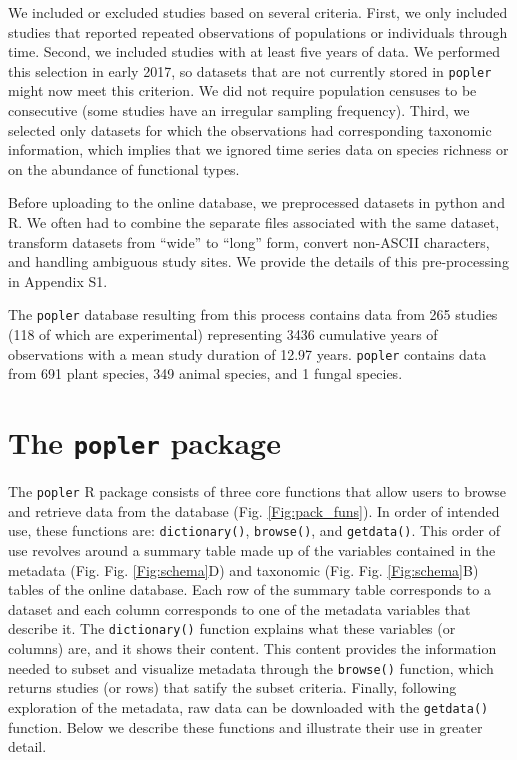 \documentclass{article}\usepackage[]{graphicx}\usepackage[]{color}
\begin{document}
We included or excluded studies based on several criteria. First, we only included studies that reported repeated observations of populations or individuals through time. Second, we included studies with at least five years of data. We performed this selection in early 2017, so datasets that are not currently stored in \texttt{popler} might now meet this criterion. We did not require population censuses to be consecutive (some studies have an irregular sampling frequency). Third, we selected only datasets for which the observations had corresponding taxonomic information, which implies that we ignored time series data on species richness or on the abundance of functional types.

Before uploading to the online database, we preprocessed datasets in python and R. We often had to combine the separate files associated with the same dataset, transform datasets from ``wide'' to ``long'' form, convert non-ASCII characters, and handling ambiguous study sites. We provide the details of this pre-processing in Appendix S1.


The \texttt{popler} database resulting from this process contains data from 265 studies (118 of which are experimental) representing 3436 cumulative years of observations with a mean study duration of 12.97 years. \texttt{popler} contains data from 691 plant species, 349 animal species, and 1 fungal species.

\section*{The \texttt{popler} package}
The \texttt{popler} R package consists of three core functions that allow users to browse and retrieve data from the database (Fig. \ref{Fig:pack_funs}). In order of intended use, these functions are: \texttt{dictionary()}, \texttt{browse()}, and \texttt{get\textunderscore data()}. This order of use revolves around a summary table made up of the variables contained in the metadata (Fig. Fig. \ref{Fig:schema}D) and taxonomic (Fig. Fig. \ref{Fig:schema}B) tables of the online database. Each row of the summary table corresponds to a dataset and each column corresponds to one of the metadata variables that describe it. The \texttt{dictionary()} function explains what these variables (or columns) are, and it shows their content. This content provides the information needed to subset and visualize metadata through the \texttt{browse()} function, which returns studies (or rows) that satify the subset criteria. Finally, following exploration of the metadata, raw data can be downloaded with the \texttt{get\textunderscore data()} function. Below we describe these functions and illustrate their use in greater detail.
\end{document}
